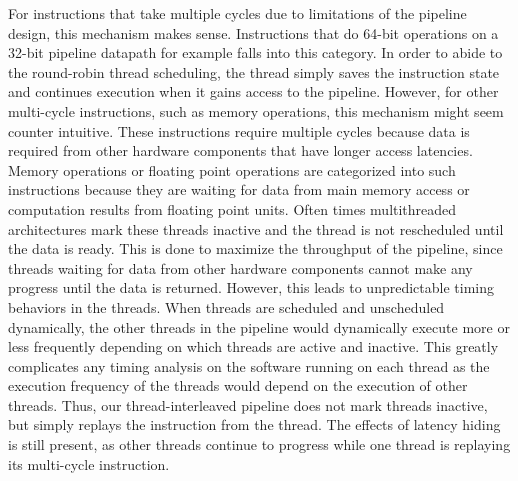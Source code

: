 For instructions that take multiple cycles due to limitations of the pipeline design, this mechanism makes sense.
Instructions that do 64-bit operations on a 32-bit pipeline datapath for example falls into this category. 
In order to abide to the round-robin thread scheduling, the thread simply saves the instruction state and continues execution when it gains access to the pipeline. 
However, for other multi-cycle instructions, such as memory operations, this mechanism might seem counter intuitive. 
These instructions require multiple cycles because data is required from other hardware components that have longer access latencies.
Memory operations or floating point operations are categorized into such instructions because they are waiting for data from main memory access or computation results from floating point units.
Often times multithreaded architectures mark these threads inactive and the thread is not rescheduled until the data is ready.
This is done to maximize the throughput of the pipeline, since threads waiting for data from other hardware components cannot make any progress until the data is returned. 
However, this leads to unpredictable timing behaviors in the threads.
When threads are scheduled and unscheduled dynamically, the other threads in the pipeline would dynamically execute more or less frequently depending on which threads are active and inactive.
This greatly complicates any timing analysis on the software running on each thread as the execution frequency of the threads would depend on the execution of other threads.
Thus, our thread-interleaved pipeline does not mark threads inactive, but simply replays the instruction from the thread.
The effects of latency hiding is still present, as other threads continue to progress while one thread is replaying its multi-cycle instruction.  

